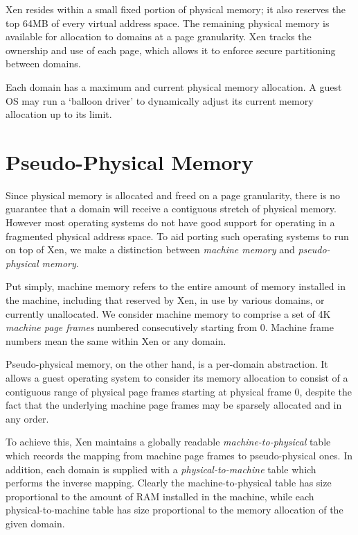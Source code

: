 \documentclass[11pt,twoside,final,openright]{xenstyle}
\begin{document}
Xen resides within a small fixed portion of physical memory; it also
reserves the top 64MB of every virtual address space. The remaining
physical memory is available for allocation to domains at a page
granularity.  Xen tracks the ownership and use of each page, which
allows it to enforce secure partitioning between domains.

Each domain has a maximum and current physical memory allocation. 
A guest OS may run a `balloon driver' to dynamically adjust its 
current memory allocation up to its limit. 



\section{Pseudo-Physical Memory}

Since physical memory is allocated and freed on a page granularity,
there is no guarantee that a domain will receive a contiguous stretch
of physical memory. However most operating systems do not have good
support for operating in a fragmented physical address space. To aid
porting such operating systems to run on top of Xen, we make a
distinction between \emph{machine memory} and \emph{pseudo-physical
memory}.

Put simply, machine memory refers to the entire amount of memory
installed in the machine, including that reserved by Xen, in use by
various domains, or currently unallocated. We consider machine memory
to comprise a set of 4K \emph{machine page frames} numbered
consecutively starting from 0. Machine frame numbers mean the same
within Xen or any domain.

Pseudo-physical memory, on the other hand, is a per-domain
abstraction. It allows a guest operating system to consider its memory
allocation to consist of a contiguous range of physical page frames
starting at physical frame 0, despite the fact that the underlying
machine page frames may be sparsely allocated and in any order.

To achieve this, Xen maintains a globally readable {\it
machine-to-physical} table which records the mapping from machine page
frames to pseudo-physical ones. In addition, each domain is supplied
with a {\it physical-to-machine} table which performs the inverse
mapping. Clearly the machine-to-physical table has size proportional
to the amount of RAM installed in the machine, while each
physical-to-machine table has size proportional to the memory
allocation of the given domain.
\end{document}
